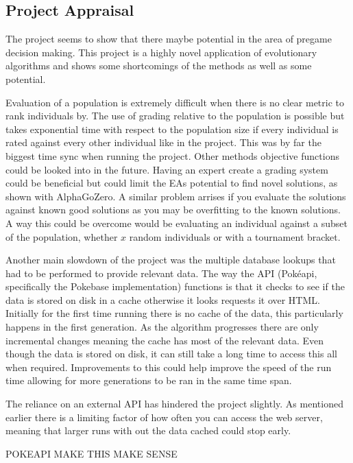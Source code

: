 \documentclass[a4paper]{article}
\newcommand{\Pokeapi}{Pok\'{e}api}
\begin{document}
\subsection{Project Appraisal}
\par
The project seems to show that there maybe potential in the area of pregame decision making.
This project is a highly novel application of evolutionary algorithms and shows some shortcomings of the methods as well as some potential.
\par
Evaluation of a population is extremely difficult when there is no clear metric to rank individuals by.
The use of grading relative to the population is possible but takes exponential time with respect to the population size if every individual is rated against every other individual like in the project.
This was by far the biggest time sync when running the project.
Other methods objective functions could be looked into in the future.
Having an expert create a grading system could be beneficial but could limit the EAs potential to find novel solutions, as shown with AlphaGoZero.
A similar problem arrises if you evaluate the solutions against known good solutions as you may be overfitting to the known solutions.
A way this could be overcome would be evaluating an individual against a subset of the population, whether $x$ random individuals or with a tournament bracket.
\par
Another main slowdown of the project was the multiple database lookups that had to be performed to provide relevant data.
The way the API (\Pokeapi{}, specifically the Pokebase implementation) functions is that it checks to see if the data is stored on disk in a cache otherwise it looks requests it over HTML\@.
Initially for the first time running there is no cache of the data, this particularly happens in the first generation.
As the algorithm progresses there are only incremental changes meaning the cache has most of the relevant data.
Even though the data is stored on disk, it can still take a long time to access this all when required.
Improvements to this could help improve the speed of the run time allowing for more generations to be ran in the same time span.
\par
The reliance on an external API has hindered the project slightly.
As mentioned earlier there is a limiting factor of how often you can access the web server, meaning that larger runs with out the data cached could stop early.

POKEAPI MAKE THIS MAKE SENSE
\end{document}
